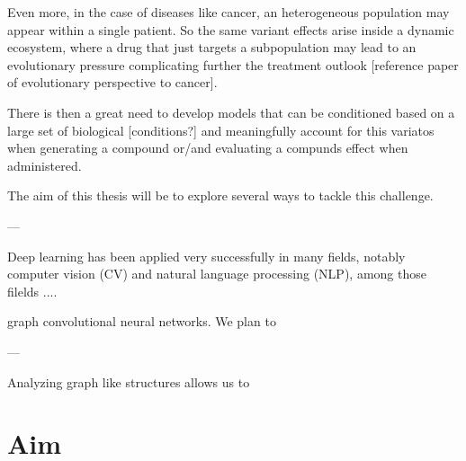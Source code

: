\documentclass{article}
\begin{document}
Even more, in the case of diseases like cancer, an heterogeneous population may appear
within a single patient. So the same variant effects arise inside a dynamic ecosystem,
where a drug that just targets a subpopulation may lead to an evolutionary pressure
complicating further the treatment outlook [reference paper of evolutionary perspective
to cancer].

There is then a great need to develop models that can be conditioned based on a large
set of biological [conditions?] and meaningfully account for this variatos when
generating a compound or/and evaluating a compunds effect when administered.

The aim of this thesis will be to explore several ways to tackle this challenge.



---

Deep learning has been applied very successfully in many fields, notably computer vision
 (CV) and natural language processing (NLP), among those filelds .... 
 
 graph convolutional neural networks. We plan to 

---

Analyzing graph like structures allows us to 



    
    \section*{Aim}
    
\end{document}
